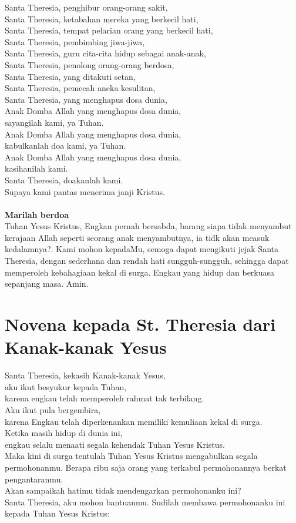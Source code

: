 Santa Theresia, penghibur orang-orang sakit,\\
Santa Theresia, ketabahan mereka yang berkecil hati,\\
Santa Theresia, tempat pelarian orang yang berkecil hati,\\
Santa Theresia, pembimbing jiwa-jiwa,\\
Santa Theresia, guru cita-cita hidup sebagai anak-anak,\\
Santa Theresia, penolong orang-orang berdosa,\\
Santa Theresia, yang ditakuti setan,\\
Santa Theresia, pemecah aneka kesulitan,\\
Santa Theresia, yang menghapus dosa dunia,\\
Anak Domba Allah yang menghapus dosa dunia,\\
sayangilah kami, ya Tuhan.\\
Anak Domba Allah yang menghapus dosa dunia,\\
kabulkanlah doa kami, ya Tuhan.\\
Anak Domba Allah yang menghapus dosa dunia,\\
kasihanilah kami.\\
Santa Theresia, doakanlah kami.\\
Supaya kami pantas menerima janji Kristus.\\
\\
\textbf{Marilah berdoa}\\
Tuhan Yesus Kristus, Engkau pernah bersabda, barang siapa tidak menyambut kerajaan Allah seperti seorang anak menyambutnya, ia tidk akan measuk kedalamnya?. Kami mohon kepadaMu, semoga dapat mengikuti jejak Santa Theresia, dengan sederhana dan rendah hati sungguh-sungguh, sehingga dapat memperoleh kebahagiaan kekal di surga. Engkau yang hidup dan berkuasa sepanjang masa. 
Amin.

\section{Novena kepada St. Theresia dari Kanak-kanak Yesus}
\normalsize
Santa Theresia, kekasih Kanak-kanak Yesus,\\
aku ikut besyukur kepada Tuhan, \\
karena engkau telah memperoleh rahmat tak terbilang. \\
Aku ikut pula bergembira, \\
karena Engkau telah diperkenankan memiliki 
kemuliaan kekal di surga.\\
Ketika masih hidup di dunia ini, \\
engkau selalu menaati segala kehendak Tuhan Yesus Kristus. \\
Maka kini di surga tentulah Tuhan Yesus Kristus mengabulkan segala permohonanmu. 
Berapa ribu saja orang yang terkabul permohonannya berkat pengantaranmu. \\
Akan sampaikah hatimu tidak mendengarkan permohonanku ini?\\
Santa Theresia, aku mohon bantuanmu. Sudilah membawa permohonanku ini kepada Tuhan Yesus Kristus:\\

